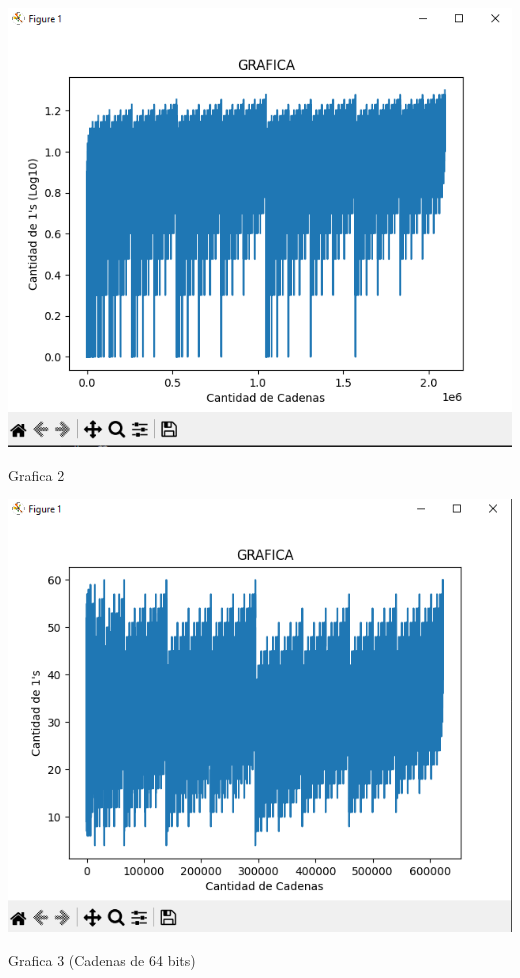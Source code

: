 \documentclass{article}
\begin{document}
\begin{center}
    \includegraphics[scale = 0.7]{graphic2.png}
    \caption{Grafica 2}
\end{center}

\begin{center}
    \includegraphics[scale = 0.7]{graphic3.png}
    \caption{Grafica 3 (Cadenas de 64 bits)}
\end{center}
\end{document}
